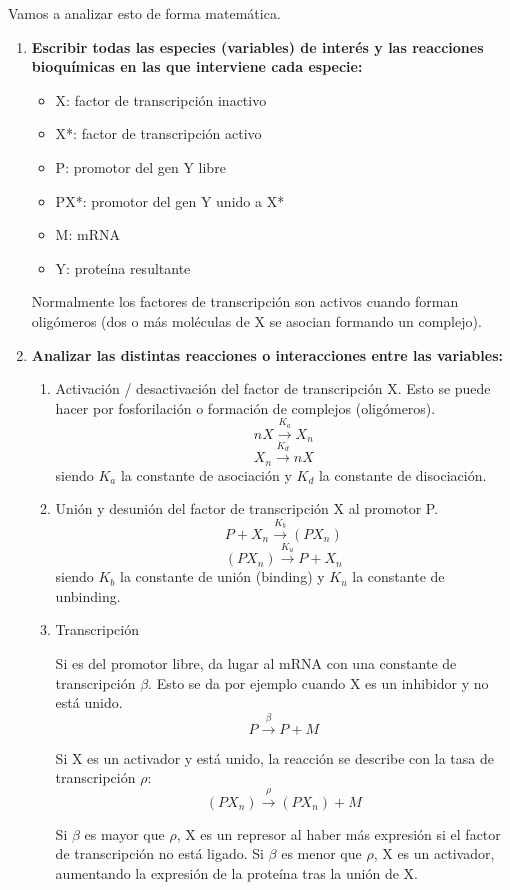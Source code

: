 Vamos a analizar esto de forma matemática.
\begin{enumerate}
\item \textbf{Escribir todas las especies (variables) de interés y las reacciones bioquímicas en las que interviene cada especie:}
\begin{itemize}
\item X: factor de transcripción inactivo
\item X*: factor de transcripción activo
\item P: promotor del gen Y libre
\item PX*: promotor del gen Y unido a X*
\item M: mRNA
\item Y: proteína resultante
\end{itemize}
Normalmente los factores de transcripción son activos cuando forman oligómeros (dos o más moléculas de X se asocian formando un complejo).

\item \textbf{Analizar las distintas reacciones o interacciones entre las variables:}
\begin{enumerate}
\item Activación / desactivación del factor de transcripción X. Esto se puede hacer por fosforilación o formación de complejos (oligómeros). 
$$nX \xrightarrow{K_a} X_n$$
$$X_n \xrightarrow{K_d} nX$$
siendo $K_a$ la constante de asociación y $K_d$ la constante de disociación.

\item Unión y desunión del factor de transcripción X al promotor P.
$$P + X_n \xrightarrow{K_b} (PX_n)$$
$$(PX_n) \xrightarrow{K_u} P + X_n$$
siendo $K_b$ la constante de unión (binding) y $K_u$ la constante de unbinding. 

\item Transcripción

Si es del promotor libre, da lugar al mRNA con una constante de transcripción $\beta$. Esto se da por ejemplo cuando X es un inhibidor y no está unido.
$$P \xrightarrow{\beta} P + M$$

Si X es un activador y está unido, la reacción se describe con la tasa de transcripción $\rho$:
$$(PX_n) \xrightarrow{\rho} (PX_n) + M$$

Si $\beta$ es mayor que $\rho$, X es un represor al haber más expresión si el factor de transcripción no está ligado. Si $\beta$ es menor que $\rho$, X es un activador, aumentando la expresión de la proteína tras la unión de X. 


\end{enumerate}
\end{enumerate}
